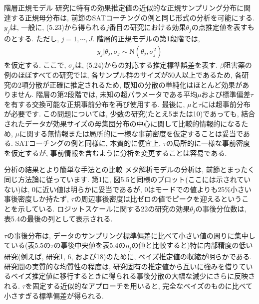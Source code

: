 \documentclass[10pt,dvipdfmx,a4]{beamer}
\newcommand{\eqn}[1]{\begin{align*}#1\end{align*}}
\begin{document}

\begin{frame}{階層正規モデル}
研究に特有の効果推定値の近似的な正規サンプリング分布に関連する正規母分布は, 前節のSATコーチングの例と同じ形式の分析を可能にする.
$y_j$は, 一般に, (5.23)から得られる$j$番目の研究における効果$\theta_j$の点推定値を表すものとする.
ただし, $j=1,\cdots,J$.
階層的正規モデルの第1段階では,
\eqn{y_j|\theta_j, \sigma_j\sim \text{N}(\theta_j,\sigma^2_j)}
を仮定する.
ここで, $\sigma_j$は, (5.24)からの対応する推定標準誤差を表す.
$\beta$阻害薬の例のほぼすべての研究では, 各サンプル群のサイズが50人以上であるため, 各研究の2項分散が正確に推定されるため, 既知の分散の単純化はほとんど効果がありません.
階層の第2段階では, 未知の超パラメータである平均$\mu$および標準偏差$\tau$を有する交換可能な正規事前分布を再び使用する.
最後に, $\mu$と$\tau$には超事前分布が必要です.
この問題については, 少数の研究(たとえ5または10)であっても, 結合されたデータが効果サイズの母集団分布の中心に関して比較的情報的になるため, $\mu$に関する無情報または局所的に一様な事前密度を仮定することは妥当である.
SATコーチングの例と同様に, 本質的に便宜上, $\tau$の局所的に一様な事前密度を仮定するが, 事前情報を含むように分析を変更することは容易である.
\end{frame}


\begin{frame}{分析の結果とより簡単な手法との比較}
メタ解析モデルの分析は, 前節とまったく同じ方法論に従っています.
第1に, 図5.5と同様のプロット(ここには示されていない)は, 0に近い値は明らかに妥当であるが, 0はモードでの値よりも25\%小さい事後密度しか持たず, $\tau$の周辺事後密度は比ゼロの値でピークを迎えるということを示している.
ロジットスケールに関する22の研究の効果$\theta_j$の事後分位数は, 表5.4の最後の列として表示される.

$\tau$の事後分布は, データのサンプリング標準偏差に比べて小さい値の周りに集中している(表5.5の$\tau$の事後中央値を表5.4の$\eta_j$の値と比較すると)特に内部精度の低い研究(例えば, 研究1, 6, および18)のために, ベイズ推定値の収縮が明らかである.
研究間の実質的な均質性の程度は, 研究固有の推定値から互いに強みを借りているベイズ推定値に移行するときに得られる事後分散の大幅な減少にさらに反映される.
$\tau$を固定する近似的なアプローチを用いると, 完全なベイズのものに比べて小さすぎる標準偏差が得られる.
\end{frame}

\end{document}
